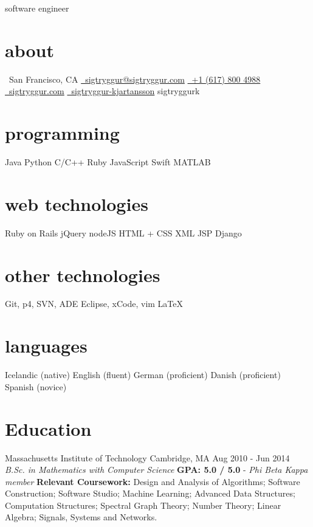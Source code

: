 \documentclass[]{friggeri-cv}
\begin{document}
       {software engineer}


\begin{aside}
  \section{about}
    \faHome~San Francisco, CA
     \href{mailto:sigtryggur@sigtryggur.com}{\faEnvelope~sigtryggur@sigtryggur.com}
    \href{tel:16178004988}{\faMobilePhone~+1 (617) 800 4988}
    \href{http://sigtryggur.com}{\faGlobe~sigtryggur.com}
    \href{https://www.linkedin.com/pub/sigtryggur-kjartansson/47/96/6aa}{\faLinkedinSign~sigtryggur-kjartansson}
    \href{https://github.com/sigtryggurk}{\faGithub} \href{http://facebook.com/sigtryggurk}{\faFacebookSign} \href{https://twitter.com/sigtryggurk}{\faTwitter} sigtryggurk
  \section{programming}
    Java
    Python
    C/C++
    Ruby
    JavaScript
    Swift
    MATLAB
  \section{web technologies}
    Ruby on Rails
    jQuery
    nodeJS
    HTML + CSS
    XML
    JSP
    Django
   \section{other technologies}
    Git, p4, SVN, ADE
    Eclipse, xCode, vim
    LaTeX
   \section{languages}
    Icelandic (native)
    English (fluent)
    German (proficient)
    Danish (proficient)
    Spanish (novice)
\end{aside}

\section{Education}

\begin{entrylist}
  \eduentry
    {Massachusetts Institute of Technology}
    {Cambridge, MA}
    {Aug 2010 - Jun 2014}
    {\emph{B.Sc. in Mathematics with Computer Science}}
    {\textbf{GPA: 5.0 / 5.0} - \textit{Phi Beta Kappa member}}
    {\textbf{Relevant Coursework:} Design and Analysis of Algorithms; Software Construction; Software
Studio; Machine Learning; Advanced Data Structures; Computation Structures; Spectral Graph Theory; Number Theory; Linear Algebra; Signals, Systems and Networks.}
\end{entrylist}
\end{document}
